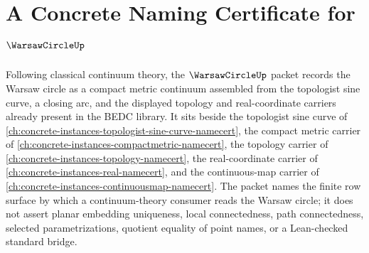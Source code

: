 \chapter{A Concrete Naming Certificate for $\WarsawCircleUp$}
\label{ch:concrete-instances-warsaw-circle-namecert}

Following classical continuum theory, the $\WarsawCircleUp$ packet records the Warsaw circle as a compact metric continuum assembled from the topologist sine curve, a closing arc, and the displayed topology and real-coordinate carriers already present in the BEDC library. It sits beside the topologist sine curve of \autoref{ch:concrete-instances-topologist-sine-curve-namecert}, the compact metric carrier of \autoref{ch:concrete-instances-compactmetric-namecert}, the topology carrier of \autoref{ch:concrete-instances-topology-namecert}, the real-coordinate carrier of \autoref{ch:concrete-instances-real-namecert}, and the continuous-map carrier of \autoref{ch:concrete-instances-continuousmap-namecert}. The packet names the finite row surface by which a continuum-theory consumer reads the Warsaw circle; it does not assert planar embedding uniqueness, local connectedness, path connectedness, selected parametrizations, quotient equality of point names, or a Lean-checked standard bridge.


